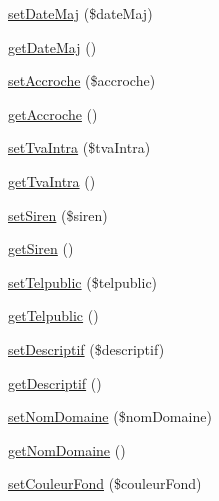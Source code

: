 \begin{DoxyCompactItemize}
\item 
\hyperlink{class_acme_group_1_1_labo_bundle_1_1_entity_1_1version_adc00e2ad7ca0ff4762c29043ab083fa3}{set\+Date\+Maj} (\$date\+Maj)
\item 
\hyperlink{class_acme_group_1_1_labo_bundle_1_1_entity_1_1version_a5c338ffb2d20c9047e65b10e24088ba3}{get\+Date\+Maj} ()
\item 
\hyperlink{class_acme_group_1_1_labo_bundle_1_1_entity_1_1version_a9eaabbc38341820dac67d55ed3d984d2}{set\+Accroche} (\$accroche)
\item 
\hyperlink{class_acme_group_1_1_labo_bundle_1_1_entity_1_1version_a58948567bbb4fffbe54b161430745bd5}{get\+Accroche} ()
\item 
\hyperlink{class_acme_group_1_1_labo_bundle_1_1_entity_1_1version_a9f77aea1438ed978ca80f0a1b67b5db2}{set\+Tva\+Intra} (\$tva\+Intra)
\item 
\hyperlink{class_acme_group_1_1_labo_bundle_1_1_entity_1_1version_af957059c74acfda5b60c24654f578748}{get\+Tva\+Intra} ()
\item 
\hyperlink{class_acme_group_1_1_labo_bundle_1_1_entity_1_1version_acd94690cea92f86715448ca6a43e97ab}{set\+Siren} (\$siren)
\item 
\hyperlink{class_acme_group_1_1_labo_bundle_1_1_entity_1_1version_aad0e438885f87cf00ba46be0454ba507}{get\+Siren} ()
\item 
\hyperlink{class_acme_group_1_1_labo_bundle_1_1_entity_1_1version_ab0a06b8adfbbaf11dbe90290c3f00bfc}{set\+Telpublic} (\$telpublic)
\item 
\hyperlink{class_acme_group_1_1_labo_bundle_1_1_entity_1_1version_aa8c5c429990c6d187ab16f0ab6c5ebed}{get\+Telpublic} ()
\item 
\hyperlink{class_acme_group_1_1_labo_bundle_1_1_entity_1_1version_a3e51deac628a1532e12def7df212dea8}{set\+Descriptif} (\$descriptif)
\item 
\hyperlink{class_acme_group_1_1_labo_bundle_1_1_entity_1_1version_afde00d9e9a94cac1d31d523cef35c2b7}{get\+Descriptif} ()
\item 
\hyperlink{class_acme_group_1_1_labo_bundle_1_1_entity_1_1version_ae9889bf4bf426e64f722d4b49efa06e1}{set\+Nom\+Domaine} (\$nom\+Domaine)
\item 
\hyperlink{class_acme_group_1_1_labo_bundle_1_1_entity_1_1version_aa6f83d99df88f9ac43c6f95994e1ccd1}{get\+Nom\+Domaine} ()
\item 
\hyperlink{class_acme_group_1_1_labo_bundle_1_1_entity_1_1version_ac34d11411b9484742155d310d9ef3091}{set\+Couleur\+Fond} (\$couleur\+Fond)

\end{DoxyCompactItemize}
